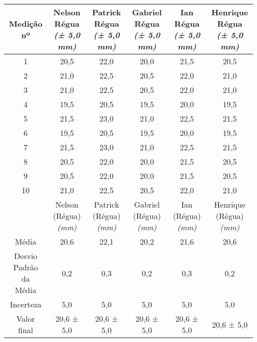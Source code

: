 \documentclass{article}
\begin{document}
\begin{table}[h!]
\centering
\begin{tabular}{c c c c c c }
\toprule
Medição nº & \shortstack{Nelson\\Régua\\\textit{(± 5,0 mm)}} & \shortstack{Patrick\\Régua\\\textit{(± 5,0 mm)}} & \shortstack{Gabriel\\Régua\\\textit{(± 5,0 mm)}} & \shortstack{Ian\\Régua\\\textit{(± 5,0 mm)}} & \shortstack{Henrique\\Régua\\\textit{(± 5,0 mm)}}\\
\midrule
1 & 20,5 & 22,0 & 20,0 & 21,5 & 20,5\\
2 & 21,0 & 22,5 & 20,5 & 22,0 & 21,0\\
3 & 21,0 & 22,5 & 20,5 & 22,0 & 21,0\\
4 & 19,5 & 20,5 & 19,5 & 20,0 & 19,5\\
5 & 21,5 & 23,0 & 21,0 & 22,5 & 21,5\\
6 & 19,5 & 20,5 & 19,5 & 20,0 & 19,5\\
7 & 21,5 & 23,0 & 21,0 & 22,5 & 21,5\\
8 & 20,5 & 22,0 & 20,0 & 21,5 & 20,5\\
9 & 20,5 & 22,0 & 20,0 & 21,5 & 20,5\\
10 & 21,0 & 22,5 & 20,5 & 22,0 & 21,0\\
\midrule
&\shortstack{Nelson\\(Régua)\\\textit{(mm)}} & \shortstack{Patrick\\(Régua)\\\textit{(mm)}} & \shortstack{Gabriel\\(Régua)\\\textit{(mm)}} & \shortstack{Ian\\(Régua)\\\textit{(mm)}} & \shortstack{Henrique\\(Régua)\\\textit{(mm)}}\\
\midrule
Média & 20,6 & 22,1 & 20,2 & 21,6 & 20,6\\[3pt]
\shortstack{Desvio\\Padrão da\\Média} & 0,2 & 0,3 & 0,2 & 0,3 & 0,2\\[3pt]
Incerteza & 5,0 & 5,0 & 5,0 & 5,0 & 5,0\\[3pt]
Valor final & 20,6 ± 5,0 & 20,6 ± 5,0 & 20,6 ± 5,0 & 20,6 ± 5,0 & 20,6 ± 5,0\\[3pt]
\bottomrule
\end{tabular}
\end{table}
\end{document}
